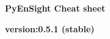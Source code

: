 \documentclass[9pt,landscape]{article}
\begin{document}
\raggedright
\footnotesize

\begin{center}
     \Huge{\textbf{PyEnSight Cheat sheet}} \\
\end{center}
\begin{center}
     \small{\textbf{version:0.5.1 (stable)}} \\
\end{center}

\vspace{-0.3cm}
\noindent\makebox[\linewidth]{\rule{\paperwidth}{2pt}}
\end{document}
